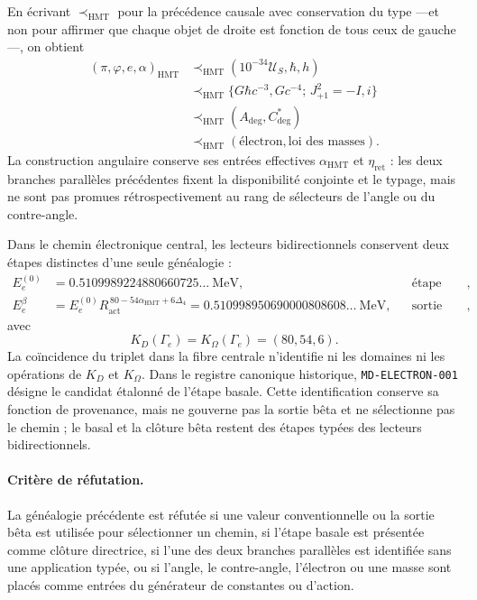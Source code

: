 En écrivant \(\prec_{\mathrm{HMT}}\) pour la précédence causale avec conservation
du type ---et non pour affirmer que chaque objet de droite est fonction de
tous ceux de gauche---, on obtient
\[
\begin{aligned}
 (\pi,\varphi,e,\alpha)_{\mathrm{HMT}}
 &\prec_{\mathrm{HMT}}(10^{-34}\mathcal U_S,\hbar,h)\\
 &\prec_{\mathrm{HMT}}
 \bigl\{G\hbar c^{-3},Gc^{-4};\,J_{+1}^{2}=-I, i\bigr\}\\
 &\prec_{\mathrm{HMT}}(A_{\mathrm{deg}},C^{*}_{\mathrm{deg}})\\
 &\prec_{\mathrm{HMT}}(\text{électron},\text{loi des masses}).
\end{aligned}
\]
La construction angulaire conserve ses entrées effectives
\(\alpha_{\mathrm{HMT}}\) et \(\eta_{\mathrm{ret}}\) : les deux branches parallèles
précédentes fixent la disponibilité conjointe et le typage, mais ne sont pas promues
rétrospectivement au rang de sélecteurs de l'angle ou du contre-angle.

Dans le chemin électronique central, les lecteurs bidirectionnels conservent deux
étapes distinctes d'une seule généalogie :
\[
 \begin{aligned}
 E_e^{(0)}
   &=0.5109989224880660725\ldots\ \mathrm{MeV},
   &&\text{étape basale},\\
 E_e^{\beta}
   &=E_e^{(0)}R_{\mathrm{act}}^{\,80-54\alpha_{\mathrm{HMT}}+6\Delta_4}
     =0.510998950690000808608\ldots\ \mathrm{MeV},
   &&\text{sortie bêta directrice},
 \end{aligned}
\]
avec
\[
 K_D(\Gamma_e)=K_{\Omega}(\Gamma_e)=(80,54,6).
\]
La coïncidence du triplet dans la fibre centrale n'identifie ni les domaines ni
les opérations de \(K_D\) et \(K_{\Omega}\). Dans le registre canonique
historique, \texttt{MD-ELECTRON-001} désigne le candidat étalonné de l'étape
basale. Cette identification conserve sa fonction de provenance, mais ne gouverne pas
la sortie bêta et ne sélectionne pas le chemin ; le basal et la clôture bêta restent
des étapes typées des lecteurs bidirectionnels.

\paragraph{Critère de réfutation.}
La généalogie précédente est réfutée si une valeur conventionnelle ou la sortie
bêta est utilisée pour sélectionner un chemin, si l'étape basale est présentée comme
clôture directrice, si l'une des deux branches parallèles est identifiée sans une
application typée, ou si l'angle, le contre-angle, l'électron ou une masse sont placés
comme entrées du générateur de constantes ou d'action.
